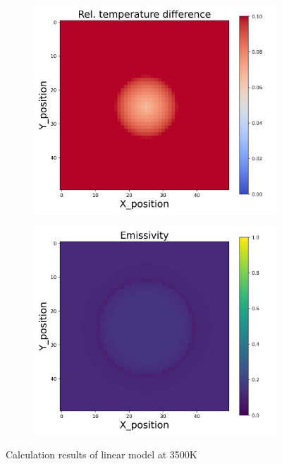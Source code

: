 \begin{figure}[htbp]
\begin{minipage}{\textwidth}
\begin{subfigure}{0.325\textwidth}
        \end{subfigure}
        \begin{subfigure}{0.325\textwidth}
            \centering
            \includegraphics[width=\textwidth]{figures/raw_data/5/T3500/linear/T_bias.jpg}
        \end{subfigure}
        \begin{subfigure}{0.325\textwidth}
            \centering
            \includegraphics[width=\textwidth]{figures/raw_data/5/T3500/linear/emi_cal.jpg}
        \end{subfigure}
    \end{minipage}
    \caption{Calculation results of linear model at 3500K}
    \label{fig: result_linear_model_3500}
\end{figure}


